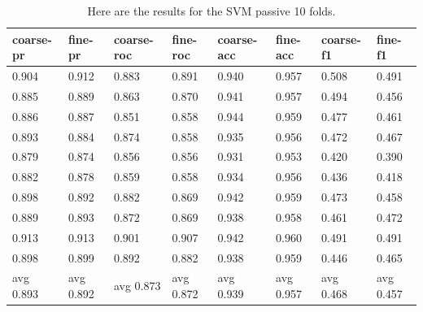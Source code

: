 \documentclass[ms]{nuthesis}
\begin{document}
\FloatBarrier
\begin{table}[h]
  \centering
  \begin{tabular}{|l||l||l||l||l||l||l||l|}\toprule
    coarse-pr & fine-pr & coarse-roc & fine-roc & coarse-acc & fine-acc & coarse-f1 & fine-f1 \\ \midrule
    0.904 & 0.912 & 0.883 & 0.891 & 0.940 & 0.957 & 0.508 & 0.491 \\
    0.885 & 0.889 & 0.863 & 0.870 & 0.941 & 0.957 & 0.494 & 0.456 \\
    0.886 & 0.887 & 0.851 & 0.858 & 0.944 & 0.959 & 0.477 & 0.461 \\
    0.893 & 0.884 & 0.874 & 0.858 & 0.935 & 0.956 & 0.472 & 0.467 \\
    0.879 & 0.874 & 0.856 & 0.856 & 0.931 & 0.953 & 0.420 & 0.390 \\
    0.882 & 0.878 & 0.859 & 0.858 & 0.934 & 0.956 & 0.436 & 0.418 \\
    0.898 & 0.892 & 0.882 & 0.869 & 0.942 & 0.959 & 0.473 & 0.458 \\
    0.889 & 0.893 & 0.872 & 0.869 & 0.938 & 0.958 & 0.461 & 0.472 \\
    0.913 & 0.913 & 0.901 & 0.907 & 0.942 & 0.960 & 0.491 & 0.491 \\
    0.898 & 0.899 & 0.892 & 0.882 & 0.938 & 0.959 & 0.446 & 0.465 \\
    avg 0.893 & avg 0.892 & avg 0.873 & avg 0.872 & avg 0.939 & avg 0.957 & avg 0.468 & avg 0.457 \\ \bottomrule
  \end{tabular}
  \caption{Here are the results for the SVM passive 10 folds.}
  \label{tab:SVM}
\end{table}
\FloatBarrier
\end{document}
